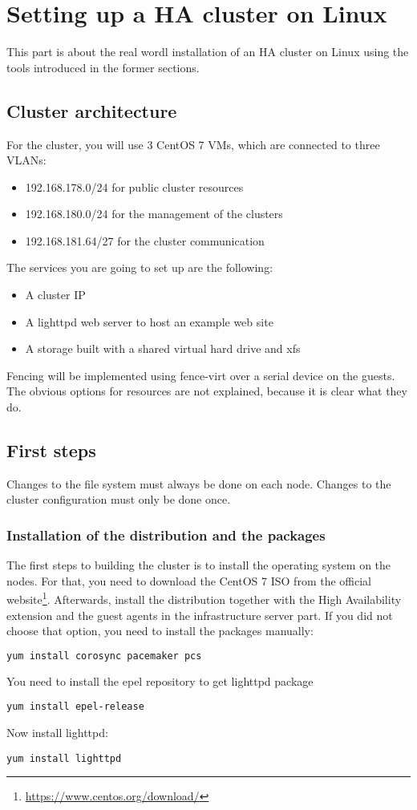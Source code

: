 \section{Setting up a HA cluster on Linux}
This part is about the real wordl installation of an \ac{HA} cluster on Linux using the tools introduced in the former sections.

\subsection{Cluster architecture}
For the cluster, you will use 3 CentOS 7 \acp{VM}, which are connected
to three \acp{VLAN}: 
\begin{itemize}
\item 192.168.178.0/24 for public cluster resources
\item 192.168.180.0/24 for the management of the clusters
\item 192.168.181.64/27 for the cluster communication
\end{itemize}
The services you are going to set up are the following:
\begin{itemize}
\item A cluster IP
\item A lighttpd web server to host an example web site
\item A storage built with a shared virtual hard drive and xfs
\end{itemize}

Fencing will be implemented using fence-virt over a serial device
on the guests.
The obvious options for resources are not explained, because it is clear what they
do.
\subsection{First steps}

Changes to the file system must always be done on each node.
Changes to the cluster configuration must only be done once.
\subsubsection{Installation of the distribution and the packages}
The first steps to building the cluster is to install the operating system on the nodes.
For that, you need to download the CentOS 7 ISO from the official website\footnote{\url{https://www.centos.org/download/}}.
Afterwards, install the distribution together with the High Availability extension
and the guest agents in the infrastructure server part.
If you did not choose that option, you need to install the packages manually:
\begin{lstlisting}[language=sh]
yum install corosync pacemaker pcs
\end{lstlisting}
You need to install the \ac{epel} repository to get lighttpd package
\begin{lstlisting}
yum install epel-release
\end{lstlisting}
Now install lighttpd:
\begin{lstlisting}
yum install lighttpd
\end{lstlisting}

